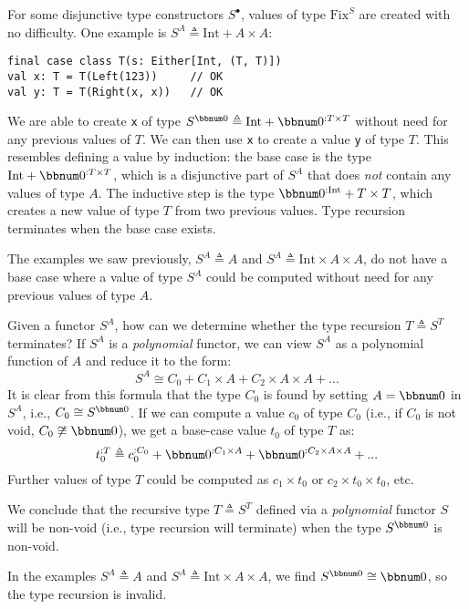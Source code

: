 For some disjunctive type constructors $S^{\bullet}$, values of type
$\text{Fix}^{S}$ are created with no difficulty. One example is $S^{A}\triangleq\text{Int}+A\times A$:
\begin{lstlisting}
final case class T(s: Either[Int, (T, T)])
val x: T = T(Left(123))     // OK
val y: T = T(Right(x, x))   // OK
\end{lstlisting}
We are able to create \lstinline!x! of type $S^{\bbnum 0}\triangleq\text{Int}+\bbnum 0^{:T\times T}$
without need for any previous values of $T$. We can then use \lstinline!x!
to create a value \lstinline!y! of type $T$. This resembles defining
a value by induction: the base case is the type $\text{Int}+\bbnum 0^{:T\times T}$,
which is a disjunctive part of $S^{A}$ that does \emph{not} contain
any values of type $A$. The inductive step is the type $\bbnum 0^{:\text{Int}}+T\times T$,
which creates a new value of type $T$ from two previous values. Type
recursion terminates when the base case exists.

The examples we saw previously, $S^{A}\triangleq A$ and $S^{A}\triangleq\text{Int}\times A\times A$,
do not have a base case where a value of type $S^{A}$ could be computed
without need for any previous values of type $A$. 

Given a functor $S^{A}$, how can we determine whether the type recursion
$T\triangleq S^{T}$ terminates? If $S^{A}$ is a \emph{polynomial}
functor, we can view $S^{A}$ as a polynomial function of $A$ and
reduce it to the form:
\begin{equation}
S^{A}\cong C_{0}+C_{1}\times A+C_{2}\times A\times A+...\label{eq:functor-polynomial-normal-form}
\end{equation}
It is clear from this formula that the type $C_{0}$ is found by setting
$A=\bbnum 0$ in $S^{A}$, i.e., $C_{0}\cong S^{\bbnum 0}$. If we
can compute a value $c_{0}$ of type $C_{0}$ (i.e., if $C_{0}$ is
not void, $C_{0}\not\cong\bbnum 0$), we get a base-case value $t_{0}$
of type $T$ as:
\[
t_{0}^{:T}\triangleq c_{0}^{:C_{0}}+\bbnum 0^{:C_{1}\times A}+\bbnum 0^{:C_{2}\times A\times A}+...
\]
Further values of type $T$ could be computed as $c_{1}\times t_{0}$
or $c_{2}\times t_{0}\times t_{0}$, etc.

We conclude that the recursive type $T\triangleq S^{T}$ defined via
a \emph{polynomial} functor $S$ will be non-void (i.e., type recursion
will terminate) when the type $S^{\bbnum 0}$ is non-void.

In the examples $S^{A}\triangleq A$ and $S^{A}\triangleq\text{Int}\times A\times A$,
we find $S^{\bbnum 0}\cong\bbnum 0$, so the type recursion is invalid.

